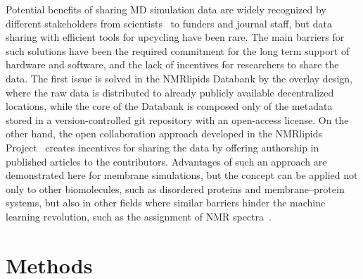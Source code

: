 \documentclass[fleqn,10pt]{wlscirep}
\begin{document}
Potential benefits of sharing MD simulation data are widely recognized by different stakeholders from scientists~\cite{feig99,tai04,silva06,abraham19,hildebrand19,hospital20,abriata20,espigares20} to funders and journal staff, but data sharing with efficient tools for upcycling have been rare. The main barriers for such solutions have been the required commitment for the long term support of hardware and software, and the lack of incentives for researchers to share the data. The first issue is solved in the NMRlipids Databank by the overlay design, where the raw data is distributed to already publicly available decentralized locations, while the core of the Databank is composed only of the metadata stored in a version-controlled git repository with an open-access license. On the other hand, the open collaboration approach developed in the NMRlipids Project~\cite{botan15} creates incentives for sharing the data by offering authorship in published articles to the contributors. Advantages of such an approach are demonstrated here for membrane simulations, but the concept can be applied not only to other biomolecules, such as disordered proteins and membrane--protein systems, but also in other fields where similar barriers hinder the machine learning revolution, such as the assignment of NMR spectra~\cite{klukowski22}. 



\newpage


\section{Methods}

\end{document}
